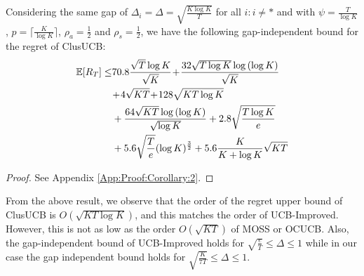 \begin{corollary}
\label{Result:Corollary:2}
Considering the same gap of $\Delta_{i} = \Delta =\sqrt{\frac{K\log K}{T}}$ for all ${i:i\neq *}$ and with $\psi=\frac{T}{\log K}$, $p=\big\lceil\frac{K}{\log K}\big\rceil$, $\rho_{a}=\frac{1}{2}$ and $\rho_{s}=\frac{1}{2}$, 
 we have the following gap-independent bound for the regret of ClusUCB:
\begin{align*}
 \mathbb{E}[R_{T}]\le & 70.8\frac{\sqrt{T}\log K}{\sqrt{K}} \!+\! \frac{32\sqrt{T\log K}\log{(\log K)}}{\sqrt{K}}\\
  &\!+\! 4\sqrt{KT} \!+\! 128\sqrt{KT\log K}\\
	& + \frac{64\sqrt{KT}\log{(\log K)}}{\sqrt{\log K}} + 2.8\sqrt{\frac{T\log K}{e}}\\
	& + 5.6\sqrt{\frac{T}{e}}(\log K)^{\frac{3}{2}} + 5.6 \frac{K}{K+\log K}\sqrt{KT}
\end{align*}
\end{corollary}
\begin{proof}
 See Appendix \ref{App:Proof:Corollary:2}.
\end{proof}


From the above result, we observe that the order of the regret upper bound of ClusUCB is $O(\sqrt{KT\log K})$, and this matches the order of UCB-Improved. However, this is not as low as the order $O(\sqrt{KT})$ of MOSS or OCUCB. Also, the gap-independent bound of UCB-Improved holds for $ \sqrt{\frac{e}{T}} \leq \Delta \leq 1$ while in our case the gap independent bound holds for $\sqrt{\frac{K}{7T}} \leq \Delta \leq 1$.

